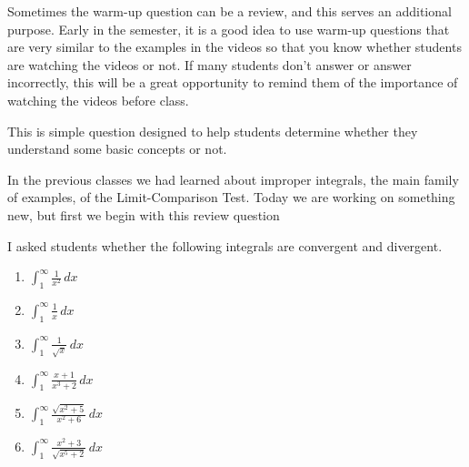 \documentclass[11pt]{article}
\begin{document}
	Sometimes the warm-up question can be a review, and this serves an additional
	purpose. Early in the semester, it is a good idea to use warm-up questions
	that are very similar to the examples in the videos so that you know whether
	students are watching the videos or not. If many students don't answer or answer
	incorrectly, this will be a great opportunity to remind them of the importance
	of watching the videos before class.

	\begin{example}
		This is simple question designed to help students determine whether they understand
		some basic concepts or not.
		\begin{background}
			In the previous classes we had learned about improper integrals, the main
			family of examples, of the Limit-Comparison Test. Today we are working on
			something new, but first we begin with this review question
		\end{background}
		\begin{question}
			I asked students whether the following integrals are convergent and divergent.
			\begin{center}
				\begin{minipage}{0.7\textwidth}
					\begin{multicols}{2}
						\begin{enumerate}
							\item ${\displaystyle \int_1^\infty \frac{1}{x^{2}} \, dx}$

							\item ${\displaystyle \int_1^\infty \frac{1}{x} \, dx}$

							\item ${\displaystyle \int_1^\infty \frac{1}{\sqrt{x}} \, dx}$

							\item ${\displaystyle \int_1^\infty \frac{x+1}{x^{3}+2} \, dx}$

							\item ${\displaystyle \int_1^\infty \frac{\sqrt{x^{2}+5}}{x^{2}+6} \, dx}$

							\item ${\displaystyle \int_1^\infty \frac{x^{2}+3}{\sqrt{x^{5}+2}} \, dx}$
						\end{enumerate}
					\end{multicols}
				\end{minipage}
			\end{center}
			\vspace{1mm}
		\end{question}


\end{example}
\end{document}

